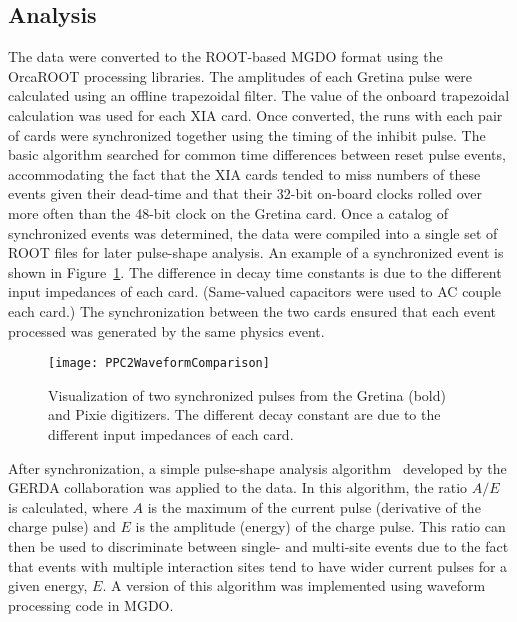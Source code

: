 		\subsection{Analysis}
	     	\label{sec:HeadToHeadCompareAnalysis}     		
	The data were converted to the ROOT-based MGDO format using the OrcaROOT processing libraries.  The amplitudes of each Gretina pulse were calculated using an offline trapezoidal filter.  The value of the onboard trapezoidal calculation was used for each XIA card.  Once converted, the runs with each pair of cards were synchronized together using the timing of the inhibit pulse.  The basic algorithm searched for common time differences between reset pulse events, accommodating the fact that the XIA cards tended to miss numbers of these events given their dead-time and that their 32-bit on-board clocks rolled over more often than the 48-bit clock on the Gretina card.  Once a catalog of synchronized events was determined, the data were compiled into a single set of ROOT files for later pulse-shape analysis.  An example of a synchronized event is shown in Figure~\ref{fig:HeadToHeadPulseExample}.  The difference in decay time constants is due to the different input impedances of each card.  (Same-valued capacitors were used to AC couple each card.)  The synchronization between the two cards ensured that each event processed was generated by the same physics event.
	
			\begin{figure}
				\centering
				\texttt{[image: PPC2WaveformComparison]}
				\caption[Visualization of synchronized pulses from the Gretina and Pixie digitizers]
				{Visualization of two synchronized pulses from the Gretina (bold) and Pixie digitizers.  
				The different decay constant are due to the different input impedances of each card.}
				\label{fig:HeadToHeadPulseExample}
			\end{figure}

	 After synchronization, a simple pulse-shape analysis algorithm~\cite{Budjas:2009zu} developed by the GERDA collaboration was applied to the data.  In this algorithm, the ratio $A/E$ is calculated, where $A$ is the maximum of the current pulse (derivative of the charge pulse) and $E$ is the amplitude (energy) of the charge pulse.  This ratio can then be used to discriminate between single- and multi-site events due to the fact that events with multiple interaction sites tend to have wider current pulses for a given energy, $E$.  A version of this algorithm was implemented using waveform processing code in MGDO.  
	 
